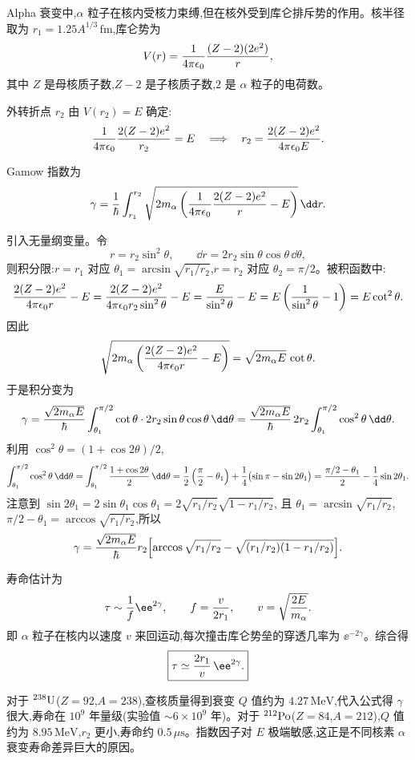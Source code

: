 \begin{solution}
Alpha 衰变中,$\alpha$ 粒子在核内受核力束缚,但在核外受到库仑排斥势的作用。核半径取为 $r_1=1.25A^{1/3}\,\mathrm{fm}$,库仑势为
\[
V(r)={1\over4\pi\epsilon_0}{(Z-2)(2e^2)\over r},
\]
其中 $Z$ 是母核质子数,$Z-2$ 是子核质子数,$2$ 是 $\alpha$ 粒子的电荷数。

外转折点 $r_2$ 由 $V(r_2)=E$ 确定:
\[
{1\over4\pi\epsilon_0}{2(Z-2)e^2\over r_2}=E
\quad\Longrightarrow\quad
r_2={2(Z-2)e^2\over4\pi\epsilon_0 E}.
\]

Gamow 指数为
\[
\gamma={1\over\hbar}\int_{r_1}^{r_2}
\sqrt{2m_\alpha\left({1\over4\pi\epsilon_0}{2(Z-2)e^2\over r}-E\right)}\,\dd r.
\]

引入无量纲变量。令
\[
r=r_2\sin^2\theta,
\qquad\dd r=2r_2\sin\theta\cos\theta\,\dd\theta,
\]
则积分限:$r=r_1$ 对应 $\theta_1=\arcsin\sqrt{r_1/r_2}$,$r=r_2$ 对应 $\theta_2=\pi/2$。被积函数中:
\[
{2(Z-2)e^2\over4\pi\epsilon_0 r}-E
={2(Z-2)e^2\over4\pi\epsilon_0 r_2\sin^2\theta}-E
={E\over\sin^2\theta}-E
=E\left({1\over\sin^2\theta}-1\right)
=E\cot^2\theta.
\]
因此
\[
\sqrt{2m_\alpha\left({2(Z-2)e^2\over4\pi\epsilon_0 r}-E\right)}
=\sqrt{2m_\alpha E}\,\cot\theta.
\]
于是积分变为
\[
\gamma={\sqrt{2m_\alpha E}\over\hbar}
\int_{\theta_1}^{\pi/2}\cot\theta\cdot 2r_2\sin\theta\cos\theta\,\dd\theta
={\sqrt{2m_\alpha E}\over\hbar}\,2r_2
\int_{\theta_1}^{\pi/2}\cos^2\theta\,\dd\theta.
\]
利用 $\cos^2\theta=(1+\cos2\theta)/2$,
\[
\int_{\theta_1}^{\pi/2}\cos^2\theta\,\dd\theta
=\int_{\theta_1}^{\pi/2}{1+\cos2\theta\over2}\,\dd\theta
={1\over2}\left({\pi\over2}-\theta_1\right)
+{1\over4}\bigl(\sin\pi-\sin2\theta_1\bigr)
={\pi/2-\theta_1\over2}-{1\over4}\sin2\theta_1.
\]
注意到 $\sin2\theta_1=2\sin\theta_1\cos\theta_1=2\sqrt{r_1/r_2}\sqrt{1-r_1/r_2}$,
且 $\theta_1=\arcsin\sqrt{r_1/r_2}$,$\pi/2-\theta_1=\arccos\sqrt{r_1/r_2}$,所以
\[
\gamma={\sqrt{2m_\alpha E}\over\hbar}r_2
\Bigl[\arccos\sqrt{r_1/r_2}-\sqrt{(r_1/r_2)(1-r_1/r_2)}\Bigr].
\]

寿命估计为
\[
\tau\sim{1\over f}\ee^{2\gamma},
\qquad f={v\over2r_1},
\qquad v=\sqrt{2E\over m_\alpha}.
\]
即 $\alpha$ 粒子在核内以速度 $v$ 来回运动,每次撞击库仑势垒的穿透几率为 $\ee^{-2\gamma}$。综合得
\[
\boxed{\tau\simeq {2r_1\over v}\,\ee^{2\gamma}.}
\]

对于 $^{238}{\rm U}$($Z=92$,$A=238$),查核质量得到衰变 $Q$ 值约为 $4.27\,\mathrm{MeV}$,代入公式得 $\gamma$ 很大,寿命在 $10^9$ 年量级(实验值 $\sim6\times10^9$ 年)。对于 $^{212}{\rm Po}$($Z=84$,$A=212$),$Q$ 值约为 $8.95\,\mathrm{MeV}$,$r_2$ 更小,寿命约 $0.5\,\mu\mathrm{s}$。指数因子对 $E$ 极端敏感,这正是不同核素 $\alpha$ 衰变寿命差异巨大的原因。
\end{solution}

